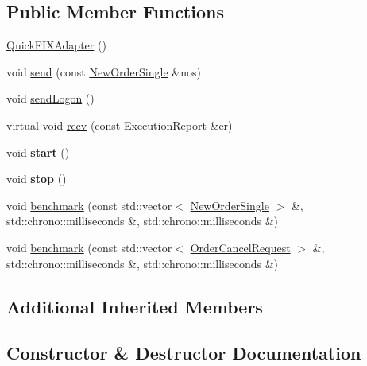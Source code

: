 \subsection*{Public Member Functions}
\begin{DoxyCompactItemize}
\item 
\hyperlink{classMetal_1_1QuickFIX_1_1QuickFIXAdapter_ac437c5ed10c4b0ed06a49b31d194be70}{Quick\+F\+I\+X\+Adapter} ()
\item 
void \hyperlink{classMetal_1_1QuickFIX_1_1QuickFIXAdapter_afda717ce98408850ccd9b7a2c953aedd}{send} (const \hyperlink{classMetal_1_1NewOrderSingle}{New\+Order\+Single} \&nos)
\item 
void \hyperlink{classMetal_1_1QuickFIX_1_1QuickFIXAdapter_a3f9dba36bbaa3d8db8af62ac07a9fff5}{send\+Logon} ()
\item 
virtual void \hyperlink{classMetal_1_1QuickFIX_1_1QuickFIXAdapter_a2556160da779a6cde56d52889b9a93db}{recv} (const Execution\+Report \&er)
\item 
\hypertarget{classMetal_1_1QuickFIX_1_1QuickFIXAdapter_a20f5db6305b3f479e12553f021765d60}{}void {\bfseries start} ()\label{classMetal_1_1QuickFIX_1_1QuickFIXAdapter_a20f5db6305b3f479e12553f021765d60}

\item 
\hypertarget{classMetal_1_1QuickFIX_1_1QuickFIXAdapter_af0e438d5d64fa8a0aa3024b5a995f885}{}void {\bfseries stop} ()\label{classMetal_1_1QuickFIX_1_1QuickFIXAdapter_af0e438d5d64fa8a0aa3024b5a995f885}

\item 
void \hyperlink{classMetal_1_1QuickFIX_1_1QuickFIXAdapter_ae987b07f906db9fc74d7f7a55eb38efe}{benchmark} (const std\+::vector$<$ \hyperlink{classMetal_1_1NewOrderSingle}{New\+Order\+Single} $>$ \&, std\+::chrono\+::milliseconds \&, std\+::chrono\+::milliseconds \&)
\item 
void \hyperlink{classMetal_1_1QuickFIX_1_1QuickFIXAdapter_aee108bf917ca43b2a5995c5d2d993e99}{benchmark} (const std\+::vector$<$ \hyperlink{classMetal_1_1OrderCancelRequest}{Order\+Cancel\+Request} $>$ \&, std\+::chrono\+::milliseconds \&, std\+::chrono\+::milliseconds \&)
\end{DoxyCompactItemize}
\subsection*{Additional Inherited Members}


\subsection{Constructor \& Destructor Documentation}
\hypertarget{classMetal_1_1QuickFIX_1_1QuickFIXAdapter_ac437c5ed10c4b0ed06a49b31d194be70}{}
